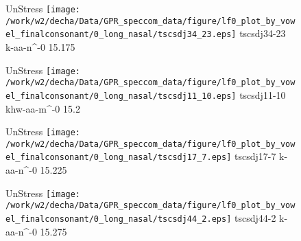 \documentclass{article}
\begin{document}
\begin{figure}[t]
\begin{minipage}[b]{.24\textwidth}
UnStress
\centering
\texttt{[image: /work/w2/decha/Data/GPR\_speccom\_data/figure/lf0\_plot\_by\_vowel\_finalconsonant/0\_long\_nasal/tscsdj34\_23.eps]}
tscsdj34-23 k-aa-n\textasciicircum-0 15.175
\end{minipage}
\begin{minipage}[b]{.24\textwidth}
UnStress
\centering
\texttt{[image: /work/w2/decha/Data/GPR\_speccom\_data/figure/lf0\_plot\_by\_vowel\_finalconsonant/0\_long\_nasal/tscsdj11\_10.eps]}
tscsdj11-10 khw-aa-m\textasciicircum-0 15.2
\end{minipage}
\begin{minipage}[b]{.24\textwidth}
UnStress
\centering
\texttt{[image: /work/w2/decha/Data/GPR\_speccom\_data/figure/lf0\_plot\_by\_vowel\_finalconsonant/0\_long\_nasal/tscsdj17\_7.eps]}
tscsdj17-7 k-aa-n\textasciicircum-0 15.225
\end{minipage}
\begin{minipage}[b]{.24\textwidth}
UnStress
\centering
\texttt{[image: /work/w2/decha/Data/GPR\_speccom\_data/figure/lf0\_plot\_by\_vowel\_finalconsonant/0\_long\_nasal/tscsdj44\_2.eps]}
tscsdj44-2 k-aa-n\textasciicircum-0 15.275
\end{minipage}
\end{figure}
\end{document}
